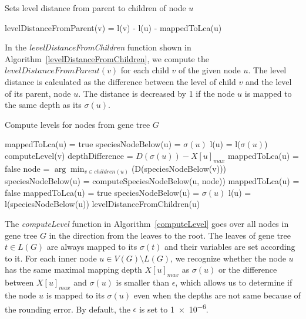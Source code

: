\begin{algorithm}[!htbp]
\caption{Sets level distance from parent to children of node $u$} 
\label{levelDistanceFromChildren}
\begin{algorithmic}[1]
		\State levelDistanceFromParent(v) = l(v) - l(u) - mappedToLca(u)
	\EndFor
\EndFunction
\end{algorithmic}
\end{algorithm}

In the \emph{levelDistanceFromChildren} function shown in Algorithm~\ref{levelDistanceFromChildren}, we compute the $levelDistanceFromParent(v)$ for each child $v$ of the given node $u$. The level distance is calculated as the difference between the level of child $v$ and the level of its parent, node $u$. The distance is decreased by 1 if the node $u$ is mapped to the same depth as its $\sigma(u)$.

\begin{algorithm}[!htbp]
\caption{Compute levels for nodes from gene tree $G$} 
\label{computeLevel}
\begin{algorithmic}[1]
		\State mappedToLca(u) = true
		\State speciesNodeBelow(u) = $\sigma(u)$
		\State l(u) = l($\sigma(u)$)
	\Else
			\State computeLevel(v)
		\EndFor
		\State depthDifference = $D(\sigma(u)) - X[u]_{max}$
			\State mappedToLca(u) = false
			\State node = $\arg \min_{v \in children(u)}$(D(speciesNodeBelow(v)))
			\State speciesNodeBelow(u) = computeSpeciesNodeBelow(u, node))
		\Else
				\State mappedToLca(u) = false
			\Else
				\State mappedToLca(u) = true
			\EndIf
			\State speciesNodeBelow(u) = $\sigma(u)$
		\EndIf
		\State l(u) = l(speciesNodeBelow(u))
		\State levelDistanceFromChildren(u)
	\EndIf
\EndFunction
\end{algorithmic}
\end{algorithm}

The \emph{computeLevel} function in Algorithm~\ref{computeLevel} goes over all nodes in gene tree $G$ in the direction from the leaves to the root. The leaves of gene tree $t \in L(G)$ are always mapped to its $\sigma(t)$ and their variables are set according to it. For each inner node $u \in V(G) \setminus L(G)$, we recognize whether the node $u$ has the same maximal mapping depth $X[u]_{max}$ as $\sigma(u)$ or the difference between $X[u]_{max}$ and $\sigma(u)$ is smaller than $\epsilon$, which allows us to determine if the node $u$ is mapped to its $\sigma(u)$ even when the depths are not same because of the rounding error. By default, the $\epsilon$ is set to \num{1e-6}.

